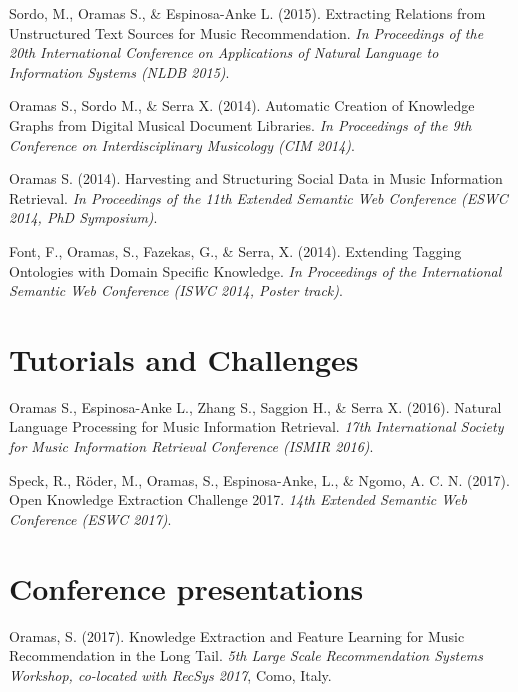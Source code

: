 \vspace{0.2cm}

Sordo, M., Oramas S., \& Espinosa-Anke L. (2015). Extracting Relations from Unstructured Text Sources for Music Recommendation. \emph{In Proceedings of the 20th International Conference on Applications of Natural Language to Information Systems (NLDB 2015)}.

\vspace{0.2cm}

Oramas S., Sordo M., \& Serra X. (2014). Automatic Creation of Knowledge Graphs from Digital Musical Document Libraries. \emph{In Proceedings of the 9th Conference on Interdisciplinary Musicology (CIM 2014)}.

\vspace{0.2cm}

Oramas S. (2014). Harvesting and Structuring Social Data in Music Information Retrieval. \emph{In Proceedings of the 11th Extended Semantic Web Conference (ESWC 2014, PhD Symposium)}.

\vspace{0.2cm}

Font, F., Oramas, S., Fazekas, G., \& Serra, X. (2014). Extending Tagging Ontologies with Domain Specific Knowledge. \emph{In Proceedings of the International Semantic Web Conference (ISWC 2014, Poster track)}.


\section*{Tutorials and Challenges}

Oramas S., Espinosa-Anke L., Zhang S., Saggion H., \& Serra X. (2016). Natural Language Processing for Music Information Retrieval. \emph{17th International Society for Music Information Retrieval Conference (ISMIR 2016)}.

\vspace{0.2cm}

Speck, R., Röder, M., Oramas, S., Espinosa-Anke, L., \& Ngomo, A. C. N. (2017). Open Knowledge Extraction Challenge 2017. \emph{14th Extended Semantic Web Conference (ESWC 2017)}.


\section*{Conference presentations}

Oramas, S. (2017). Knowledge Extraction and Feature Learning for Music Recommendation in the Long Tail. \emph{5th Large Scale Recommendation Systems Workshop, co-located with RecSys 2017}, Como, Italy.

